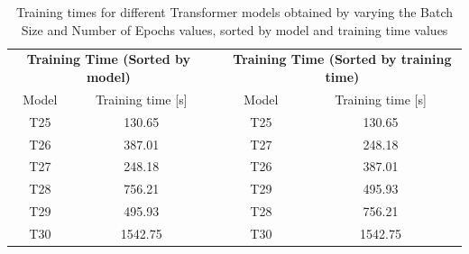     
\begin{table}[]
    \begin{tabular}{ccccc}
    \multicolumn{2}{c}{\textbf{Training   Time (Sorted by model)}} &  & \multicolumn{2}{c}{\textbf{Training Time (Sorted   by training time)}} \\
    Model             & Training time {[}s{]}                      &  & Model                 & Training time {[}s{]}                          \\
    T25               & \cellcolor[HTML]{63BE7B}130.65             &  & T25                   & \cellcolor[HTML]{63BE7B}130.65                 \\
    T26               & \cellcolor[HTML]{E3E382}387.01             &  & T27                   & \cellcolor[HTML]{9DCF7E}248.18                 \\
    T27               & \cellcolor[HTML]{9DCF7E}248.18             &  & T26                   & \cellcolor[HTML]{E3E382}387.01                 \\
    T28               & \cellcolor[HTML]{FDC67D}756.21             &  & T29                   & \cellcolor[HTML]{FFE583}495.93                 \\
    T29               & \cellcolor[HTML]{FFE583}495.93             &  & T28                   & \cellcolor[HTML]{FDC67D}756.21                 \\
    T30               & \cellcolor[HTML]{F8696B}1542.75            &  & T30                   & \cellcolor[HTML]{F8696B}1542.75               
    \end{tabular}
    \caption{Training times for different Transformer models obtained by varying the Batch Size and Number of Epochs values, sorted by model and training time values}
    \label{T5_T}
    \end{table}

